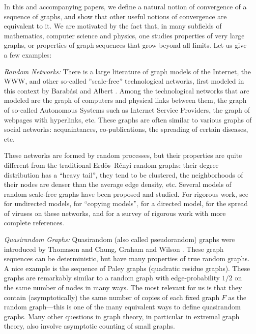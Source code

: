 \documentclass[12pt]{article}
\numberwithin{equation}{section}
\begin{document}
In this and accompanying papers, we define a natural notion
of convergence of a sequence of graphs, and show that other useful
notions of convergence are equivalent to it.  We are motivated by
the fact that, in many subfields of
mathematics, computer science and physics, one studies
properties of very large graphs, or properties of graph sequences
that grow beyond all limits.  Let us give a few examples:

\smallskip

{\it Random Networks:} There is a large literature of graph models
of the Internet, the WWW, and other so-called ''scale-free''
technological networks, {first modeled in this context by
Barab\'asi and Albert \cite{BA}. Among the technological networks
that are modeled are} the graph of computers and physical links
between them, the graph of {so-called Autonomous Systems such as
Internet Service Providers,} the graph of webpages with hyperlinks,
etc. These graphs are often similar to various graphs of social
networks: acquaintances, co-publications, the spreading of certain
diseases, etc.

These networks are formed by random processes, but their properties
are quite different from the traditional Erd\H{o}s--R\'enyi random
graphs: their degree distribution has a ``heavy tail'', they tend to
be clustered, the neighborhoods of their nodes are denser than the
average edge density, etc. Several models of random {scale-free}
graphs have been proposed and studied. {For rigorous work, see
\cite{BR,BRST} for undirected models, \cite{copy} for ``copying
models'', \cite{BBCR} for a directed model, \cite{BBCS} for the
spread of viruses on these networks, and \cite{BR-rev} for a survey
of rigorous work with more complete references.}


{\it Quasirandom Graphs:  } Quasirandom (also called pseudorandom)
graphs were introduced by Thomason \cite{Tho} and Chung, Graham and
Wilson \cite{CGW}. These graph sequences {can be} deterministic, but
have many properties of true random graphs. A nice example is the
sequence of Paley graphs (quadratic residue graphs).
These graphs are remarkably similar to a random graph with
edge-probability $1/2$ on the same number of nodes in many ways. The
most relevant for us is that they contain (asymptotically) the same
number of copies of each fixed graph $F$ as the random
graph---this is one of the many equivalent ways to define
quasirandom graphs. Many other questions in graph theory, in
particular in extremal graph theory, also involve asymptotic counting
of small graphs.
\end{document}
